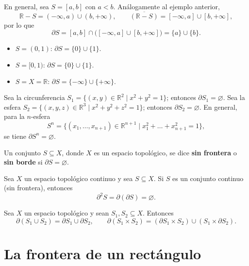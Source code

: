 \begin{ejemplo}
En general, sea $S=[a,b]$ con $a<b$. Análogamente al ejemplo anterior,
\[
\mathbb{R}-S = (-\infty,a)\cup(b,+\infty), \qquad
\overline{(\mathbb{R}-S)} = [-\infty,a]\cup[b,+\infty],
\]
por lo que
\[
\partial S = [a,b]\cap\big([-\infty,a]\cup[b,+\infty]\big) = \{a\}\cup\{b\}.
\]
\end{ejemplo}

\begin{ejemplo}
\begin{itemize}
\item $S=(0,1)$: $\partial S = \{0\}\cup\{1\}$.
\item $S=[0,1)$: $\partial S = \{0\}\cup\{1\}$.
\item $S=X=\mathbb{R}$: $\partial S = \{-\infty\}\cup\{+\infty\}$.
\end{itemize}
\end{ejemplo}

\begin{ejemplo}
Sea la circunferencia $S_1 = \{(x,y)\in\mathbb{R}^2\mid x^2+y^2=1\}$;
entonces $\partial S_1 = \varnothing$. Sea la esfera
$S_2 = \{(x,y,z)\in\mathbb{R}^3\mid x^2+y^2+z^2=1\}$; entonces
$\partial S_2 = \varnothing$. En general, para la $n$-esfera
\[
S^n = \{(x_1,\dots,x_{n+1})\in\mathbb{R}^{n+1} \mid x_1^2+\dots+x_{n+1}^2
=1\},
\]
se tiene $\partial S^n = \varnothing$.
\end{ejemplo}

\begin{definicion}
Un conjunto $S\subseteq X$, donde $X$ es un espacio topológico, se dice
\textbf{sin frontera} o \textbf{sin borde} si $\partial S = \varnothing$.
\end{definicion}

\begin{proposicionc}
Sea $X$ un espacio topológico continuo y sea $S\subseteq X$. Si $S$ es un
conjunto continuo (sin frontera), entonces
\[
\partial^2 S = \partial(\partial S) = \varnothing .
\]
\end{proposicionc}

\begin{proposicionc}
Sea $X$ un espacio topológico y sean $S_1,S_2\subseteq X$. Entonces
\[
\partial(S_1\cup S_2) = \partial S_1 \cup \partial S_2, \qquad
\partial(S_1\times S_2) = (\partial S_1 \times S_2) \cup
(S_1\times \partial S_2).
\]
\end{proposicionc}

\section{La frontera de un rectángulo}

